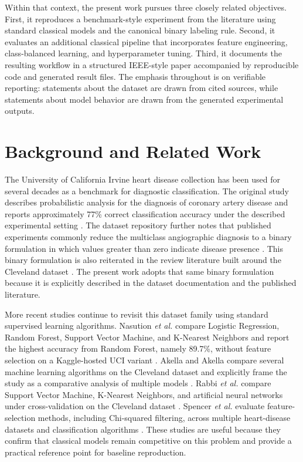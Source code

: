 \documentclass[conference]{IEEEtran}
\begin{document}
Within that context, the present work pursues three closely related objectives. First, it reproduces a benchmark-style experiment from the literature using standard classical models and the canonical binary labeling rule. Second, it evaluates an additional classical pipeline that incorporates feature engineering, class-balanced learning, and hyperparameter tuning. Third, it documents the resulting workflow in a structured IEEE-style paper accompanied by reproducible code and generated result files. The emphasis throughout is on verifiable reporting: statements about the dataset are drawn from cited sources, while statements about model behavior are drawn from the generated experimental outputs.

\section{Background and Related Work}
The University of California Irvine heart disease collection has been used for several decades as a benchmark for diagnostic classification. The original study describes probabilistic analysis for the diagnosis of coronary artery disease and reports approximately 77\% correct classification accuracy under the described experimental setting \cite{detrano1989cad}. The dataset repository further notes that published experiments commonly reduce the multiclass angiographic diagnosis to a binary formulation in which values greater than zero indicate disease presence \cite{uciheart}. This binary formulation is also reiterated in the review literature built around the Cleveland dataset \cite{ruqiya2023review,akella2021cad}. The present work adopts that same binary formulation because it is explicitly described in the dataset documentation and the published literature.

More recent studies continue to revisit this dataset family using standard supervised learning algorithms. Nasution \textit{et al.} compare Logistic Regression, Random Forest, Support Vector Machine, and K-Nearest Neighbors and report the highest accuracy from Random Forest, namely 89.7\%, without feature selection on a Kaggle-hosted UCI variant \cite{nasution2025heart}. Akella and Akella compare several machine learning algorithms on the Cleveland dataset and explicitly frame the study as a comparative analysis of multiple models \cite{akella2021cad}. Rabbi \textit{et al.} compare Support Vector Machine, K-Nearest Neighbors, and artificial neural networks under cross-validation on the Cleveland dataset \cite{rabbi2018performance}. Spencer \textit{et al.} evaluate feature-selection methods, including Chi-squared filtering, across multiple heart-disease datasets and classification algorithms \cite{spencer2020feature}. These studies are useful because they confirm that classical models remain competitive on this problem and provide a practical reference point for baseline reproduction.
\end{document}
